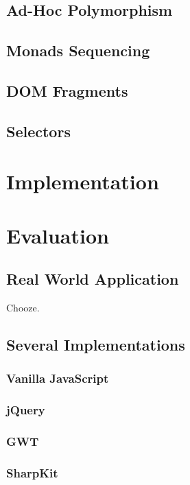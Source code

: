 \documentclass[preprint]{sigplanconf}
\begin{document}
\subsection{Ad-Hoc Polymorphism}

\subsection{Monads Sequencing}

\subsection{DOM Fragments}

\subsection{Selectors}

\section{Implementation}

\section{Evaluation}
\label{validation}

\subsection{Real World Application}

Chooze.

\subsection{Several Implementations}

\subsubsection{Vanilla JavaScript}

\subsubsection{jQuery}

\subsubsection{GWT}

\subsubsection{SharpKit}
\end{document}

